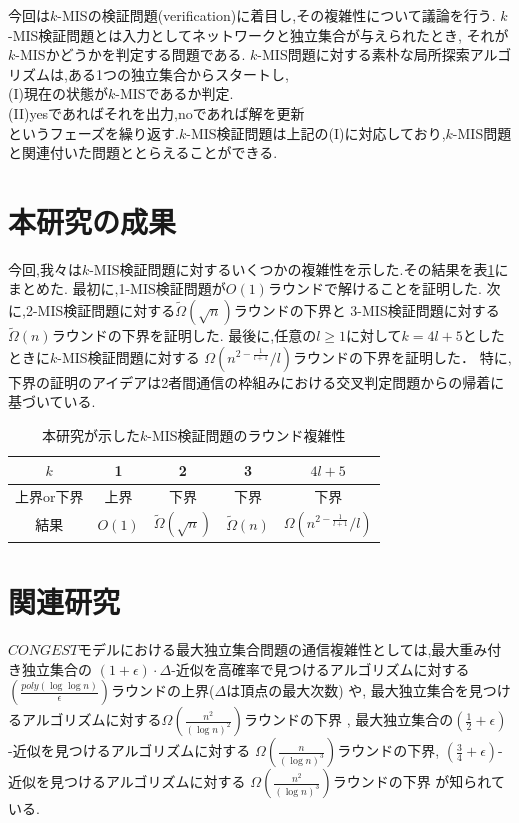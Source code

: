 \documentclass[12pt]{thesis}
\theoremstyle{definition}
\begin{document}
今回は$k$-MISの検証問題(verification)に着目し,その複雑性について議論を行う.
$k$-MIS検証問題とは入力としてネットワークと独立集合が与えられたとき,
それが$k$-MISかどうかを判定する問題である.
$k$-MIS問題に対する素朴な局所探索アルゴリズムは,ある1つの独立集合からスタートし, \\
(I)現在の状態が$k$-MISであるか判定. \\
(II)yesであればそれを出力,noであれば解を更新 \\
というフェーズを繰り返す.$k$-MIS検証問題は上記の(I)に対応しており,$k$-MIS問題と関連付いた問題ととらえることができる.

\section{本研究の成果}
今回,我々は$k$-MIS検証問題に対するいくつかの複雑性を示した.その結果を表\ref{tab: k-MIS}にまとめた.
最初に,1-MIS検証問題が$O(1)$ラウンドで解けることを証明した.
次に,2-MIS検証問題に対する$\tilde{\Omega} (\sqrt{n})$ラウンドの下界と
3-MIS検証問題に対する$\tilde{\Omega} (n)$ラウンドの下界を証明した.
最後に,任意の$l \geq 1$に対して$k = 4l + 5$としたときに$k$-MIS検証問題に対する
$\Omega\left(n^{2 - \frac{1}{l+1}}/l\right)$ラウンドの下界を証明した．
特に,下界の証明のアイデアは2者間通信の枠組みにおける交叉判定問題からの帰着に基づいている.

\begin{table}[htb]
  \begin{center}
    \caption{本研究が示した$k$-MIS検証問題のラウンド複雑性}
    \begin{tabular}{|c||c|c|c|c|} \hline
      $k$ & 1 & 2 & 3 & $4l + 5$ \\ \hline
      上界or下界 & 上界 & 下界 & 下界 & 下界 \\ \hline
      結果 & $O(1)$ & $\tilde{\Omega} (\sqrt{n})$ & $\tilde{\Omega} (n)$ & $\Omega\left(n^{2 - \frac{1}{l+1}}/l\right)$ \\ \hline
    \end{tabular}
    \label{tab: k-MIS}
  \end{center}
\end{table}

\section{関連研究} 
$CONGEST$モデルにおける最大独立集合問題の通信複雑性としては,最大重み付き独立集合の
$(1 + \epsilon) \cdot \Delta$-近似を高確率で見つけるアルゴリズムに対する
$\left(\frac{poly(\log \log n)}{\epsilon}\right)$ラウンドの上界($\Delta$は頂点の最大次数) \cite{kawarabayashi2019improved} や,
最大独立集合を見つけるアルゴリズムに対する$\Omega \left(\frac{n^{2}}{(\log n)^{2}}\right)$ラウンドの下界 \cite{censor2017quadratic},
最大独立集合の$(\frac{1}{2} + \epsilon)$-近似を見つけるアルゴリズムに対する
$\Omega \left(\frac{n}{(\log n)^{3}}\right)$ラウンドの下界,
$(\frac{3}{4} + \epsilon)$-近似を見つけるアルゴリズムに対する
$\Omega \left(\frac{n^{2}}{(\log n)^{3}}\right)$ラウンドの下界 \cite{efron2020beyond} が知られている.
 
\end{document}

